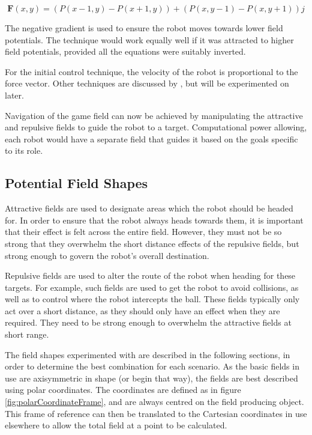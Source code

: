 \documentclass[10pt]{article}
\begin{document}
\begin{equation}
\boldsymbol{F}(x,y)=\left(P\left(x-1,y\right)-P\left(x+1,y\right)\right)+\left(P\left(x,y-1\right)-P\left(x,y+1\right)\right)j
\end{equation}

The negative gradient is used to ensure the robot moves towards lower field potentials. The technique would work equally well if it was attracted to higher field potentials, provided all the equations were suitably inverted.

For the initial control technique, the velocity of the robot is proportional to the force vector. Other techniques are discussed by \cite{intelligentAlgorithmPathPlanning}, but will be experimented on later.

Navigation of the game field can now be achieved by manipulating the attractive and repulsive fields to guide the robot to a target. Computational power allowing, each robot would have a separate field that guides it based on the goals specific to its role.

\subsection{Potential Field Shapes}

Attractive fields are used to designate areas which the robot should be headed for. In order to ensure that the robot always heads towards them, it is important that their effect is felt across the entire field. However, they must not be so strong that they overwhelm the short distance effects of the repulsive fields, but strong enough to govern the robot's overall destination.

Repulsive fields are used to alter the route of the robot when heading for these targets. For example, such fields are used to get the robot to avoid collisions, as well as to control where the robot intercepts the ball. These fields typically only act over a short distance, as they should only have an effect when they are required. They need to be strong enough to overwhelm the attractive fields at short range.

The field shapes experimented with are described in the following sections, in order to determine the best combination for each scenario. As the basic fields in use are axisymmetric in shape (or begin that way), the fields are best described using polar coordinates. The coordinates are defined as in figure \ref{fig:polarCoordinateFrame}, and are always centred on the field producing object. This frame of reference can then be translated to the Cartesian coordinates in use elsewhere to allow the total field at a point to be calculated.
\end{document}
